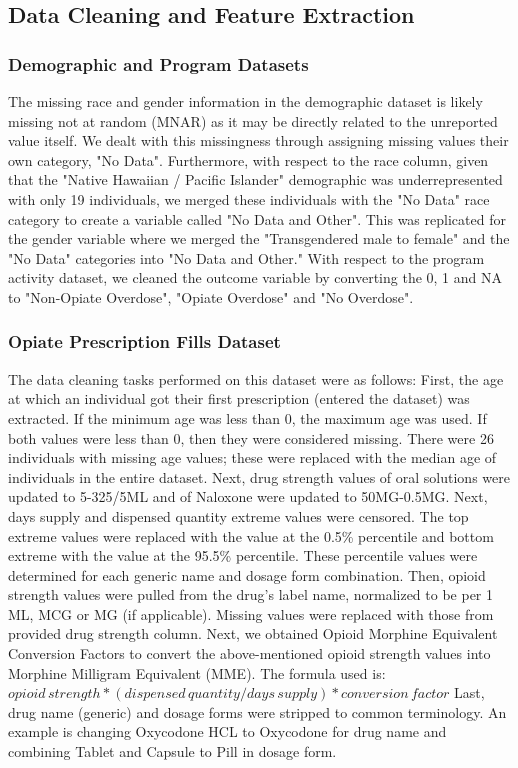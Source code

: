 \documentclass[twoside,10.5pt]{article}
\let\footnote=\endnote
\begin{document}
\subsection{Data Cleaning and Feature Extraction}
\subsubsection{Demographic and Program Datasets}
The missing race and gender information in the demographic dataset is likely missing not at random (MNAR) as it may be directly related to the unreported value itself. We dealt with this missingness through assigning missing values their own category, "No Data". Furthermore, with respect to the race column, given that the "Native Hawaiian / Pacific Islander" demographic was underrepresented with only 19 individuals, we merged these individuals with the "No Data" race category to create a variable called "No Data and Other". This was replicated for the gender variable where we merged the "Transgendered male to female" and the "No Data" categories into "No Data and Other." With respect to the program activity dataset, we cleaned the outcome variable by converting the 0, 1 and NA to "Non-Opiate Overdose", "Opiate Overdose" and "No Overdose". 

\subsubsection{Opiate Prescription Fills Dataset}
The data cleaning tasks performed on this dataset were as follows: First, the age at which an individual got their first prescription (entered the dataset) was extracted. If the minimum age was less than 0, the maximum age was used. If both values were less than 0, then they were considered missing. There were 26 individuals with missing age values; these were replaced with the median age of individuals in the entire dataset. Next, drug strength values of oral solutions were updated to 5-325/5ML and of Naloxone were updated to 50MG-0.5MG. Next, days supply and dispensed quantity extreme values were censored. The top extreme values were replaced with the value at the 0.5\% percentile and bottom extreme with the value at the 95.5\% percentile. These percentile values were determined for each generic name and dosage form combination. Then, opioid strength values were pulled from the drug's label name, normalized to be per 1 ML, MCG or MG (if applicable). Missing values were replaced with those from provided drug strength column. Next, we obtained Opioid Morphine Equivalent Conversion Factors\footnote{\cite{CMS}} to convert the above-mentioned opioid strength values into Morphine Milligram Equivalent (MME). The formula used is: $opioid\,strength * (dispensed\,quantity / days\,supply) * conversion\,factor$
Last, drug name (generic) and dosage forms were stripped to common terminology. An example is changing Oxycodone HCL to Oxycodone for drug name and combining Tablet and Capsule to Pill in dosage form. 
\end{document}
